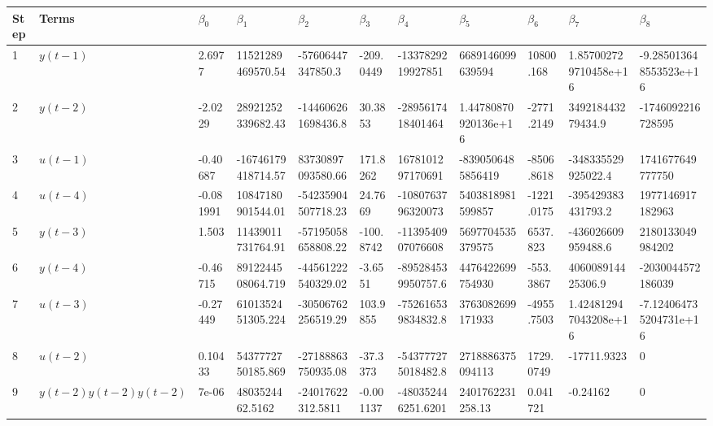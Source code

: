 \begin{tabular}{lllllllllll}
Step & Terms & $\beta_{0}$ & $\beta_{1}$ & $\beta_{2}$ & $\beta_{3}$ & $\beta_{4}$ & $\beta_{5}$ & $\beta_{6}$ & $\beta_{7}$ & $\beta_{8}$ \\ 
\hline 
1 & $y(t-1)$ & 2.6977 & 11521289469570.54 & -57606447347850.3 & -209.0449 & -1337829219927851 & 6689146099639594 & 10800.168 & 1.857002729710458e+16 & -9.285013648553523e+16 \\ 
2 & $y(t-2)$ & -2.0229 & 28921252339682.43 & -144606261698436.8 & 30.3853 & -2895617418401464 & 1.44780870920136e+16 & -2771.2149 & 349218443279434.9 & -1746092216728595 \\ 
3 & $u(t-1)$ & -0.40687 & -16746179418714.57 & 83730897093580.66 & 171.8262 & 1678101297170691 & -8390506485856419 & -8506.8618 & -348335529925022.4 & 1741677649777750 \\ 
4 & $u(t-4)$ & -0.081991 & 10847180901544.01 & -54235904507718.23 & 24.7669 & -1080763796320073 & 5403818981599857 & -1221.0175 & -395429383431793.2 & 1977146917182963 \\ 
5 & $y(t-3)$ & 1.503 & 11439011731764.91 & -57195058658808.22 & -100.8742 & -1139540907076608 & 5697704535379575 & 6537.823 & -436026609959488.6 & 2180133049984202 \\ 
6 & $y(t-4)$ & -0.46715 & 8912244508064.719 & -44561222540329.02 & -3.6551 & -895284539950757.6 & 4476422699754930 & -553.3867 & 406008914425306.9 & -2030044572186039 \\ 
7 & $u(t-3)$ & -0.27449 & 6101352451305.224 & -30506762256519.29 & 103.9855 & -752616539834832.8 & 3763082699171933 & -4955.7503 & 1.424812947043208e+16 & -7.124064735204731e+16 \\ 
8 & $u(t-2)$ & 0.10433 & 5437772750185.869 & -27188863750935.08 & -37.3373 & -543777275018482.8 & 2718886375094113 & 1729.0749 & -17711.9323 & 0 \\ 
9 & $y(t-2)y(t-2)y(t-2)$ & 7e-06 & 4803524462.5162 & -24017622312.5811 & -0.001137 & -480352446251.6201 & 2401762231258.13 & 0.041721 & -0.24162 & 0 \\ 
\hline 
\end{tabular}